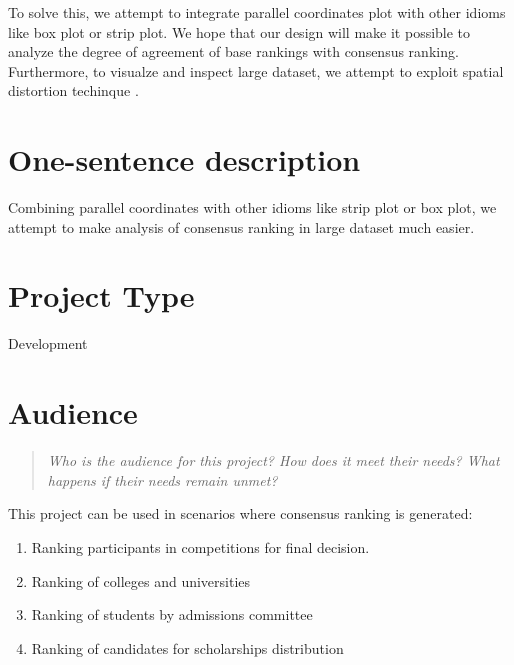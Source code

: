 \documentclass{proc}
\begin{document}
To solve this, we attempt to integrate parallel coordinates plot with other idioms like box plot or strip plot. We hope that our design will make it possible to analyze the degree of agreement of base rankings with consensus ranking. Furthermore, to visualze and inspect large dataset, we attempt to exploit spatial distortion techinque \cite{sarkar1993stretching}.




% 

\section{One-sentence description}
Combining parallel coordinates with other idioms like strip plot or box plot, we attempt to make analysis of consensus ranking in large dataset much easier.

\section{Project Type}
Development

\section{Audience} 
\begin{quote}
\textit{Who is the audience for this project? 
How does it meet their needs? 
What happens if their needs remain unmet?}
\end{quote}

This project can be used in scenarios where consensus ranking is generated:
\begin{enumerate}
  \item Ranking participants in competitions for final decision.
  \item Ranking of colleges and universities
  \item Ranking of students by admissions committee
  \item Ranking of candidates for scholarships distribution 
\end{enumerate}
\end{document}
